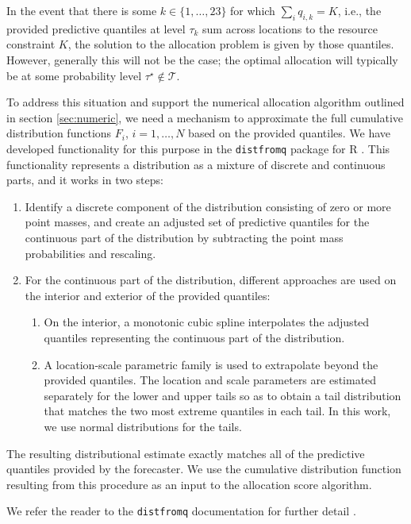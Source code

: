 \documentclass{article}\usepackage[]{graphicx}\usepackage[]{xcolor}
\begin{document}
In the event that there is some $k \in \{1, \ldots, 23\}$ for which $\sum_i q_{i,k} = K$, i.e., the provided predictive
quantiles at level $\tau_k$ sum across locations to the resource constraint $K$, the solution to the allocation problem
is given by those quantiles. However, generally this will not be the case; the optimal allocation will typically be at
some probability level $\tau^\star \notin \mathcal{T}$.

To address this situation and support the numerical allocation algorithm outlined in section \ref{sec:numeric}, we need
a mechanism to approximate the full cumulative distribution functions $F_i$, $i = 1, \ldots, N$ based on the provided
quantiles. We have developed functionality for this purpose in the \verb`distfromq` package for R \citep{ray-distfromq}.
This functionality represents a distribution as a mixture of discrete and continuous parts, and it works in two steps:
\begin{enumerate}
  \item Identify a discrete component of the distribution consisting of zero or more point masses, and create an
    adjusted set of predictive quantiles for the continuous part of the distribution by subtracting the point mass
    probabilities and rescaling.
  \item For the continuous part of the distribution, different approaches are used on the interior and exterior of the
    provided quantiles:
  \begin{enumerate}
    \item On the interior, a monotonic cubic spline interpolates the adjusted quantiles representing the continuous part
      of the distribution.
    \item A location-scale parametric family is used to extrapolate beyond the provided quantiles. The location and
      scale parameters are estimated separately for the lower and upper tails so as to obtain a tail distribution that
      matches the two most extreme quantiles in each tail. In this work, we use normal distributions for the tails.
  \end{enumerate}
\end{enumerate}
The resulting distributional estimate exactly matches all of the predictive quantiles provided by the forecaster. We use
the cumulative distribution function resulting from this procedure as an input to the allocation score algorithm.

We refer the reader to the \verb`distfromq` documentation for further detail \citep{ray-distfromq}.
\end{document}
